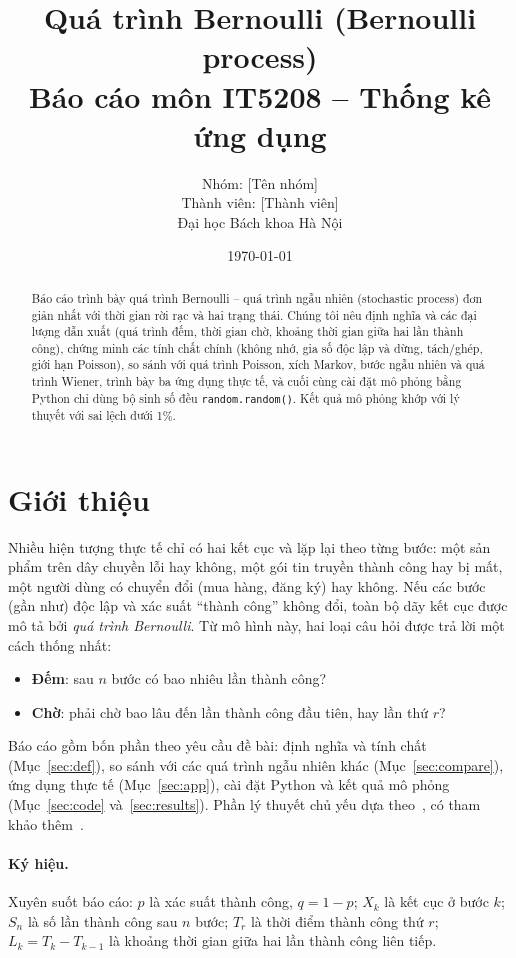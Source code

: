 \documentclass[12pt,a4paper]{article}
\title{\textbf{\color{hustred} Quá trình Bernoulli (Bernoulli process)}\\[4pt]
  \large Báo cáo môn IT5208 – Thống kê ứng dụng}
\author{Nhóm: [Tên nhóm]\\ Thành viên: [Thành viên]\\[2pt]
  \small Đại học Bách khoa Hà Nội}
\date{\today}
\theoremstyle{definition}
\theoremstyle{remark}
\begin{document}
\maketitle

\begin{abstract}
Báo cáo trình bày quá trình Bernoulli – quá trình ngẫu nhiên (stochastic process) đơn giản nhất với thời gian
rời rạc và hai trạng thái. Chúng tôi nêu định nghĩa và các đại lượng dẫn xuất (quá trình đếm, thời gian chờ,
khoảng thời gian giữa hai lần thành công), chứng minh các tính chất chính (không nhớ, gia số độc lập và dừng,
tách/ghép, giới hạn Poisson), so sánh với quá trình Poisson, xích Markov, bước ngẫu nhiên và quá trình Wiener,
trình bày ba ứng dụng thực tế, và cuối cùng cài đặt mô phỏng bằng Python chỉ dùng bộ sinh số đều
\texttt{random.random()}. Kết quả mô phỏng khớp với lý thuyết với sai lệch dưới 1\%.
\end{abstract}

\tableofcontents
\newpage

\section{Giới thiệu}\label{sec:intro}
Nhiều hiện tượng thực tế chỉ có hai kết cục và lặp lại theo từng bước: một sản phẩm trên dây chuyền lỗi hay
không, một gói tin truyền thành công hay bị mất, một người dùng có chuyển đổi (mua hàng, đăng ký) hay không.
Nếu các bước (gần như) độc lập và xác suất ``thành công'' không đổi, toàn bộ dãy kết cục được mô tả bởi
\emph{quá trình Bernoulli}. Từ mô hình này, hai loại câu hỏi được trả lời một cách thống nhất:
\begin{itemize}
  \item \textbf{Đếm}: sau $n$ bước có bao nhiêu lần thành công?
  \item \textbf{Chờ}: phải chờ bao lâu đến lần thành công đầu tiên, hay lần thứ $r$?
\end{itemize}
Báo cáo gồm bốn phần theo yêu cầu đề bài: định nghĩa và tính chất (Mục~\ref{sec:def}), so sánh với các quá
trình ngẫu nhiên khác (Mục~\ref{sec:compare}), ứng dụng thực tế (Mục~\ref{sec:app}), cài đặt Python và kết quả
mô phỏng (Mục~\ref{sec:code} và~\ref{sec:results}). Phần lý thuyết chủ yếu dựa theo~\cite{bertsekas}, có
tham khảo thêm~\cite{ross,grimmett}.

\paragraph{Ký hiệu.} Xuyên suốt báo cáo: $p$ là xác suất thành công, $q = 1-p$; $X_k$ là kết cục ở bước $k$;
$S_n$ là số lần thành công sau $n$ bước; $T_r$ là thời điểm thành công thứ $r$; $L_k = T_k - T_{k-1}$ là
khoảng thời gian giữa hai lần thành công liên tiếp.
\end{document}

